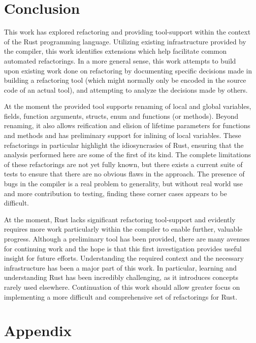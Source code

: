 \chapter{Conclusion}\label{C:con}
This work has explored refactoring and providing tool-support within the context of the Rust programming language. Utilizing existing infrastructure provided by the compiler, this work identifies extensions which help facilitate common automated refactorings. In a more general sense, this work attempts to build upon existing work done on refactoring by documenting specific decisions made in building a refactoring tool (which might normally only be encoded in the source code of an actual tool), and attempting to analyze the decisions made by others.


At the moment the provided tool supports renaming of local and global variables, fields, function arguments, structs, enum and functions (or methods). Beyond renaming, it also allows reification and elision of lifetime parameters for functions and methods and has preliminary support for inlining of local variables. These refactorings in particular highlight the idiosyncrasies of Rust, ensuring that the analysis performed here are some of the first of its kind. The complete limitations of these refactorings are not yet fully known, but there exists a current suite of tests to ensure that there are no obvious flaws in the approach. The presence of bugs in the compiler is a real problem to generality, but without real world use and more contribution to testing, finding these corner cases appears to be difficult.

At the moment, Rust lacks significant refactoring tool-support and evidently requires more work particularly within the compiler to enable further, valuable progress. Although a preliminary tool has been provided, there are many avenues for continuing work and the hope is that this first investigation provides useful insight for future efforts. Understanding the required context and the necessary infrastructure has been a major part of this work. In particular, learning and understanding Rust has been incredibly challenging, as it introduces concepts rarely used elsewhere. Continuation of this work should allow greater focus on implementing a more difficult and comprehensive set of refactorings for Rust.

\chapter{Appendix}\label{C:appen}
